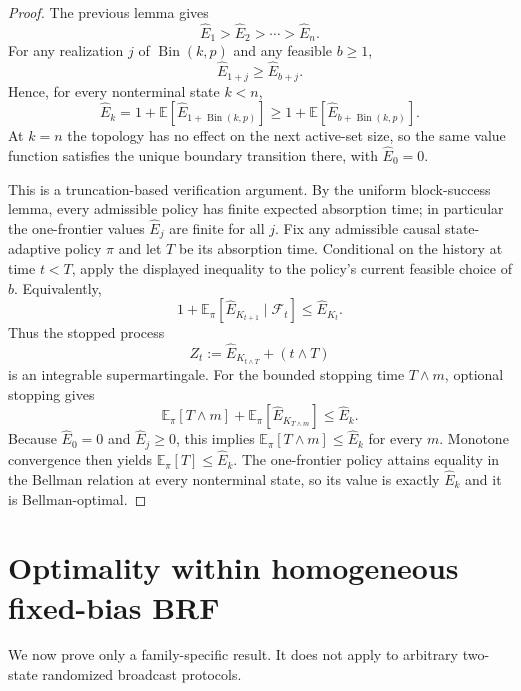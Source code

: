 \documentclass[11pt]{article}
\newcommand{\E}{\mathbb{E}}
\newcommand{\Bin}{\operatorname{Bin}}
\begin{document}
\begin{proof}
The previous lemma gives
\[
  \widehat E_1>\widehat E_2>\cdots>\widehat E_n.
\]
For any realization $j$ of $\Bin(k,p)$ and any feasible $b\ge1$,
\[
  \widehat E_{1+j}\ge \widehat E_{b+j}.
\]
Hence, for every nonterminal state $k<n$,
\[
  \widehat E_k
  =
  1+\E[\widehat E_{1+\Bin(k,p)}]
  \ge
  1+\E[\widehat E_{b+\Bin(k,p)}].
\]
At $k=n$ the topology has no effect on the next active-set size, so the same
value function satisfies the unique boundary transition there, with
$\widehat E_0=0$.

This is a truncation-based verification argument.  By the uniform
block-success lemma, every admissible policy has finite expected absorption
time; in particular the one-frontier values $\widehat E_j$ are finite for all
$j$.  Fix any admissible causal state-adaptive policy $\pi$ and let $T$ be its
absorption time.  Conditional on the history at time $t<T$, apply the displayed
inequality to the policy's current feasible choice of $b$.  Equivalently,
\[
  1+\E_\pi[\widehat E_{K_{t+1}}\mid\mathcal F_t]
  \le \widehat E_{K_t}.
\]
Thus the stopped process
\[
  Z_t:=\widehat E_{K_{t\wedge T}}+(t\wedge T)
\]
is an integrable supermartingale.  For the bounded stopping time $T\wedge m$,
optional stopping gives
\[
  \E_\pi[T\wedge m]
  +\E_\pi[\widehat E_{K_{T\wedge m}}]
  \le \widehat E_k.
\]
Because $\widehat E_0=0$ and $\widehat E_j\ge0$, this implies
$\E_\pi[T\wedge m]\le\widehat E_k$ for every $m$.  Monotone convergence
then yields $\E_\pi[T]\le\widehat E_k$.  The one-frontier policy attains
equality in the Bellman relation at every nonterminal state, so its value is
exactly $\widehat E_k$ and it is Bellman-optimal.
\end{proof}

\section{Optimality within homogeneous fixed-bias BRF}

We now prove only a family-specific result.  It does not apply to arbitrary
two-state randomized broadcast protocols.
\end{document}
